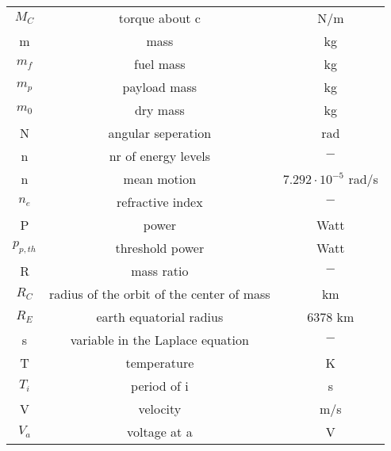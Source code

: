 \begin{center}
\begin{longtable}{c|c|c}
$M_C$ 															& torque about c 															& N/m \\

m 																	& mass 																				& kg \\

$m_f$																& fuel mass 																	& kg \\

$m_p$ 															& payload mass 																& kg \\

$m_0$ 															& dry mass 																		& kg \\

N 																	& angular seperation 													& rad \\

n 																	& nr of energy levels 												& $-$ \\

n 																	& mean motion 																& $7.292\cdot 10^{ - 5}$ rad/s \\

$n_e$ 															& refractive index 														& $-$ \\

P 																	& power 																			& Watt \\

$p_{p,th}$ 													& threshold power 														& Watt \\

R 																	& mass ratio 																	& $-$ \\

$R_C$ 															& radius of the orbit of the center of mass 	& km \\

$R_E$ 															& earth equatorial radius 										& 6378 km \\

s 																	& variable in the Laplace equation 						& $-$ \\

T 																	& temperature 																& K \\

$T_i$ 															& period of i																	& s \\

V																		& velocity																		& m/s \\

$V_a$ 															& voltage at a 																& V \\


\end{longtable}
\end{center}
